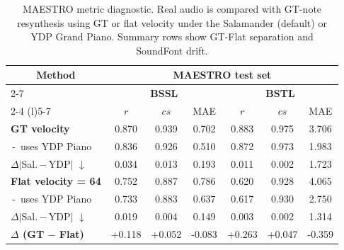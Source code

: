 \begin{table}[!ht]
\caption{MAESTRO metric diagnostic. Real audio is compared with GT-note resynthesis using GT or flat velocity under the Salamander (default) or YDP Grand Piano. Summary rows show GT-Flat separation and SoundFont drift.}
\label{tab:bp_metric_diagnostic}
\centering
\fontsize{11pt}{13pt}\selectfont
\setlength{\tabcolsep}{11pt}
\renewcommand{\arraystretch}{1.2}
\begin{tabular}{l||ccc|ccc}
\toprule
\multicolumn{1}{c||}{\multirow{3}{*}{\textbf{Method}}}
& \multicolumn{6}{c}{\textbf{MAESTRO test set}} \\
\cmidrule(l){2-7}
& \multicolumn{3}{c|}{\textbf{BSSL}} & \multicolumn{3}{c}{\textbf{BSTL}} \\
\cmidrule(lr){2-4} \cmidrule(l){5-7}
& $r$ & $cs$ & MAE & $r$ & $cs$ & MAE \\
\midrule
\textbf{GT velocity}            & 0.870 & 0.939 & 0.702 & 0.883 & 0.975 & 3.706 \\
\,-\, uses YDP Piano            & 0.836 & 0.926 & 0.510 & 0.872 & 0.973 & 1.983 \\
$\Delta\lvert$Sal.\,$-$\,YDP$\rvert$ $\downarrow$
                                & 0.034 & 0.013 & 0.193
                                & 0.011 & 0.002 & 1.723 \\
\midrule
\textbf{Flat velocity = 64}     & 0.752 & 0.887 & 0.786 & 0.620 & 0.928 & 4.065 \\
\,-\, uses YDP Piano            & 0.733 & 0.883 & 0.637 & 0.617 & 0.930 & 2.750 \\
$\Delta\lvert$Sal.\,$-$\,YDP$\rvert$ $\downarrow$
                                & 0.019 & 0.004 & 0.149
                                & 0.003 & 0.002 & 1.314 \\
\midrule
\textbf{$\Delta$ (GT $-$ Flat)}
                                & +0.118 & +0.052 & -0.083
                                & +0.263 & +0.047 & -0.359 \\
\bottomrule
\end{tabular}
\end{table}
